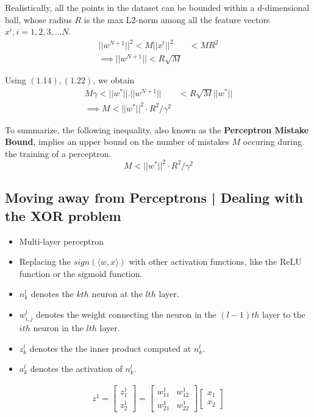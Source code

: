 \documentclass{report}
\begin{document}
\noindent Realistically, all the points in the dataset can be bounded within a d-dimensional ball, whose radius $R$ is the max L2-norm among all the feature vectors $x^i, i = 1,2,3,...N$.
\begin{align}
  ||w^{N+1}||^2 < M||x^t||^2 & < MR^2 \\
  \implies ||w^{N+1}|| < R\sqrt{M}
\end{align}

\noindent Using $(1.14),(1.22)$, we obtain
\begin{align}
  M\gamma < ||w^*||.||w^{N+1}|| & < R\sqrt{M}||w^*|| \\
  \implies M < ||w^*||^2\cdot R^2/\gamma^2
\end{align}

\noindent To summarize, the following inequality, also known as the \textbf{Perceptron Mistake Bound}, implies an upper bound on the number of mistakes $M$ occuring during the training of a perceptron.
$$
  \boxed{M < ||w^*||^2\cdot R^2/\gamma^2}
$$

\newpage
\subsection{Moving away from Perceptrons | Dealing with the XOR problem}

\begin{itemize}
  \item Multi-layer perceptron
  \item Replacing the $sign(\langle w,x \rangle)$ with other activation functions, like the ReLU function or the sigmoid function.
\end{itemize}

\begin{itemize}
  \item $n_k^l$ denotes the $kth$ neuron at the $lth$ layer.
  \item $w_{i,j}^l$ denotes the weight connecting the neuron in the $(l-1)th$ layer to the $ith$ neuron in the $lth$ layer.
  \item $z_k^l$ denotes the the inner product computed at $n_k^l$.
  \item $a_k^l$ denotes the activation of $n_k^l$.
\end{itemize}

\begin{align}
  z^1 = \begin{bmatrix}
          z_1^1 \\
          z_2^1
        \end{bmatrix} = \begin{bmatrix}
                          w_{11}^1 & w_{12}^1 \\
                          w_{21}^1 & w_{22}^1
                        \end{bmatrix} \begin{bmatrix}
                                        x_1 \\
                                        x_2
                                      \end{bmatrix}
\end{align}
\end{document}
